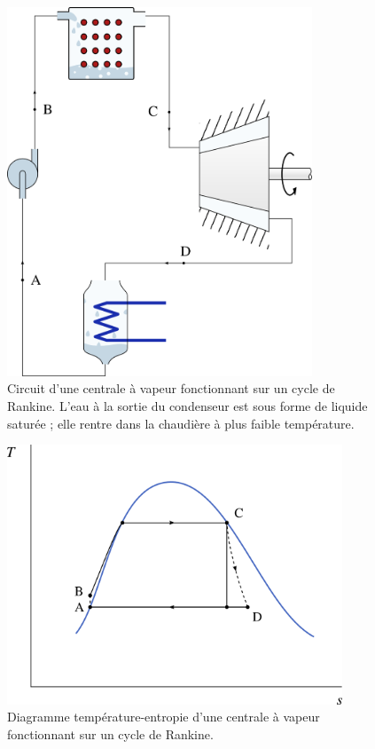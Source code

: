 		\begin{figure}
			\begin{center}
				\includegraphics[height=11cm]{images/circuit_rankine.png}
			\end{center}
			\caption{Circuit d’une centrale à vapeur fonctionnant sur un cycle de Rankine. L’eau à la sortie du condenseur est sous forme de liquide saturée ; elle rentre dans la chaudière à plus faible température.}
			\label{fig_cycle_rankine}
		\end{figure}

		\begin{figure}
			\begin{center}
				\includegraphics[width=10cm]{images/ts_lv_rankine.png}
			\end{center}
			\caption{Diagramme température-entropie d’une centrale à vapeur fonctionnant sur un cycle de Rankine.}
			\label{fig_ts_lv_rankine}
		\end{figure}

